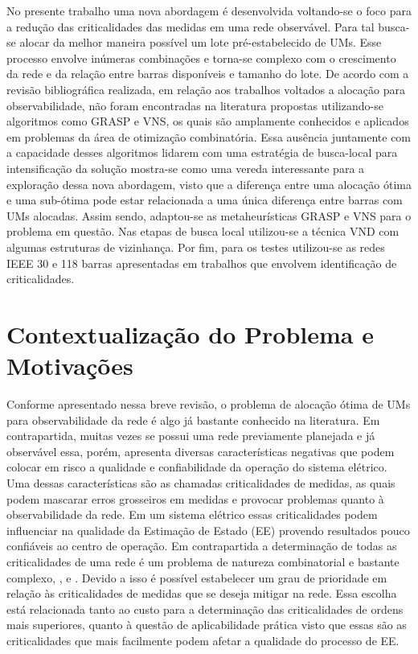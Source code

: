 \documentclass[12pt]{article}
\begin{document}
No presente trabalho uma nova abordagem é desenvolvida voltando-se o foco para a redução das criticalidades das medidas em uma rede observável. Para tal busca-se alocar da melhor maneira possível um lote pré-estabelecido de UMs. Esse processo envolve inúmeras combinações e torna-se complexo com o crescimento da rede e da relação entre barras disponíveis e tamanho do lote. De acordo com a revisão bibliográfica realizada, em relação aos trabalhos voltados a alocação para observabilidade, não foram encontradas na literatura propostas utilizando-se algoritmos como GRASP e VNS, os quais são amplamente conhecidos e aplicados em problemas da área de otimização combinatória. Essa ausência juntamente com a capacidade desses algoritmos lidarem com uma estratégia de busca-local para intensificação da solução mostra-se como uma vereda interessante para a exploração dessa nova abordagem, visto que a diferença entre uma alocação ótima e uma sub-ótima pode estar relacionada a uma única diferença entre barras com UMs alocadas. Assim sendo, adaptou-se as metaheurísticas GRASP e VNS para o problema em questão. Nas etapas de busca local utilizou-se a técnica VND com algumas estruturas de vizinhança. Por fim, para os testes utilizou-se as redes IEEE 30 e 118 barras apresentadas em trabalhos que envolvem identificação de criticalidades.

\section{Contextualização do Problema e Motivações}

Conforme apresentado nessa breve revisão, o problema de alocação ótima de UMs para observabilidade da rede é algo já bastante conhecido na literatura. Em contrapartida, muitas vezes se possui uma rede previamente planejada e já observável essa, porém, apresenta diversas características negativas que podem colocar em risco a qualidade e confiabilidade da operação do sistema elétrico. Uma dessas características são as chamadas criticalidades de medidas, as quais podem mascarar erros grosseiros em medidas e provocar problemas quanto à observabilidade da rede. Em um sistema elétrico essas criticalidades podem influenciar na qualidade da Estimação de Estado (EE) provendo resultados pouco confiáveis ao centro de operação. Em contrapartida a determinação de todas as criticalidades de uma rede é um problema de natureza combinatorial e bastante complexo, \cite{AbelTese16},\cite{Sou12} e \cite{BB16}. Devido a isso é possível estabelecer um grau de prioridade em relação às criticalidades de medidas que se deseja mitigar na rede. Essa escolha está relacionada tanto ao custo para a determinação das criticalidades de ordens mais superiores, quanto à questão de aplicabilidade prática visto que essas são as criticalidades que mais facilmente podem afetar a qualidade do processo de EE.
\end{document}

